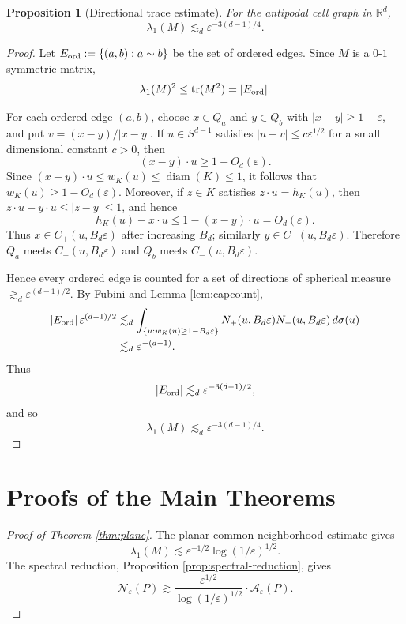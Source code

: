\documentclass[11pt]{article}
\newtheorem{proposition}[theorem]{Proposition}
\newcommand{\R}{\mathbb R}
\newcommand{\eps}{\varepsilon}
\newcommand{\diam}{\operatorname{diam}}
\newcommand{\cN}{\mathcal N}
\newcommand{\cA}{\mathcal A}
\begin{document}
\smallskip
\noindent
\begin{proposition}[Directional trace estimate]\label{prop:trace}
For the antipodal cell graph in $\R^d$,
\[
   \lambda_1(M)
   \lesssim_d
   \eps^{-3(d-1)/4}.
\]
\end{proposition}

\begin{proof}
Let $E_{\rm ord}:=\{(a,b):a\sim b\}$ be the set of ordered edges.  Since $M$ is a $0$-$1$ symmetric matrix,
\[
   \lambda_1(M)^2\le\operatorname{tr}(M^2)=|E_{\rm ord}|.
\]

\smallskip
\noindent
For each ordered edge $(a,b)$, choose $x\in Q_a$ and $y\in Q_b$ with $|x-y|\ge1-\eps$, and put $v=(x-y)/|x-y|$.  If $u\in S^{d-1}$ satisfies $|u-v|\le c\eps^{1/2}$ for a small dimensional constant $c>0$, then
\[
   (x-y)\cdot u\ge1-O_d(\eps).
\]
Since $(x-y)\cdot u\le w_K(u)\le\diam(K)\le1$, it follows that $w_K(u)\ge1-O_d(\eps)$.  Moreover, if $z\in K$ satisfies $z\cdot u=h_K(u)$, then $z\cdot u-y\cdot u\le |z-y|\le1$, and hence
\[
   h_K(u)-x\cdot u\le 1-(x-y)\cdot u=O_d(\eps).
\]
Thus $x\in C_+(u,B_d\eps)$ after increasing $B_d$; similarly $y\in C_-(u,B_d\eps)$.  Therefore $Q_a$ meets $C_+(u,B_d\eps)$ and $Q_b$ meets $C_-(u,B_d\eps)$.

\bigskip
\noindent
Hence every ordered edge is counted for a set of directions of spherical measure $\gtrsim_d\eps^{(d-1)/2}$.  By Fubini and Lemma \ref{lem:capcount},
\[
\begin{aligned}
   |E_{\rm ord}|\,\eps^{(d-1)/2}
   &\lesssim_d
   \int_{\{u:w_K(u)\ge1-B_d\eps\}}
   N_+(u,B_d\eps)N_-(u,B_d\eps)\,d\sigma(u)  \\
   &\lesssim_d
   \eps^{-(d-1)}.
\end{aligned}
\]
Thus
\[
   |E_{\rm ord}|\lesssim_d \eps^{-3(d-1)/2},
\]
and so
\[
   \lambda_1(M)\lesssim_d \eps^{-3(d-1)/4}.
\]
\end{proof}

\section{Proofs of the Main Theorems}

\begin{proof}[Proof of Theorem \ref{thm:plane}]
The planar common-neighborhood estimate gives
\[
   \lambda_1(M)
   \lesssim
   \eps^{-1/2}\log(1/\eps)^{1/2}.
\]
The spectral reduction, Proposition \ref{prop:spectral-reduction}, gives
\[
   \cN_\eps(P)
   \gtrsim
   \frac{\eps^{1/2}}{\log(1/\eps)^{1/2}}\cdot\cA_\eps(P).
\]
\end{proof}
\end{document}
